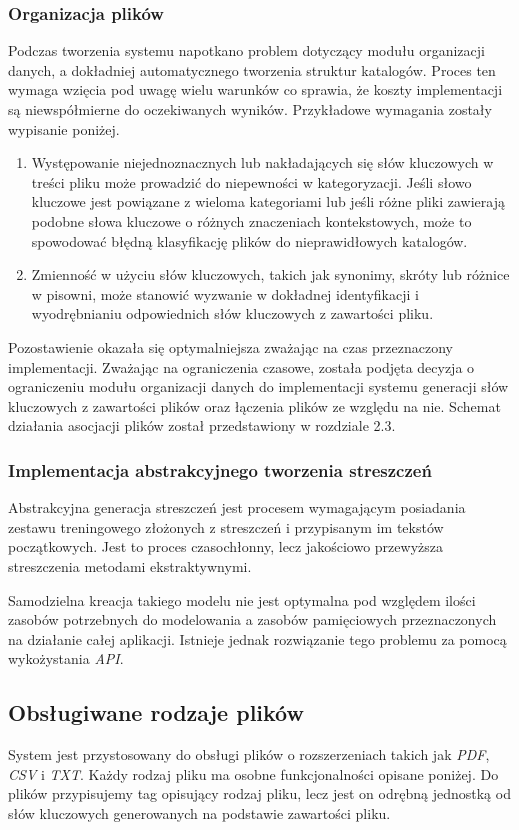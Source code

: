 \documentclass[12pt,a4paper,twoside]{article}
\begin{document}
\subsubsection*{Organizacja plików}
Podczas tworzenia systemu napotkano problem dotyczący modułu organizacji danych, a dokładniej automatycznego tworzenia struktur katalogów. Proces ten wymaga wzięcia pod uwagę wielu warunków co sprawia, że koszty implementacji są niewspółmierne do oczekiwanych wyników. Przykładowe wymagania zostały wypisanie poniżej.
\begin{enumerate}
	\item Występowanie niejednoznacznych lub nakładających się słów kluczowych w treści pliku może prowadzić do niepewności w kategoryzacji. Jeśli słowo kluczowe jest powiązane z wieloma kategoriami lub jeśli różne pliki zawierają podobne słowa kluczowe o różnych znaczeniach kontekstowych, może to spowodować błędną klasyfikację plików do nieprawidłowych katalogów.
	\item Zmienność w użyciu słów kluczowych, takich jak synonimy, skróty lub różnice w pisowni, może stanowić wyzwanie w dokładnej identyfikacji i wyodrębnianiu odpowiednich słów kluczowych z zawartości pliku. 
\end{enumerate}
Pozostawienie okazała się optymalniejsza zważając na czas przeznaczony implementacji.
Zważając na ograniczenia czasowe, została podjęta decyzja o ograniczeniu modułu organizacji danych do implementacji systemu generacji słów kluczowych z zawartości plików oraz łączenia plików ze względu na nie. Schemat działania asocjacji plików został przedstawiony w rozdziale 2.3.
\subsubsection*{Implementacja abstrakcyjnego tworzenia streszczeń}
Abstrakcyjna generacja streszczeń jest procesem wymagającym posiadania zestawu treningowego złożonych z streszczeń i przypisanym im tekstów początkowych. Jest to proces czasochłonny, lecz jakościowo przewyższa streszczenia metodami ekstraktywnymi. \par
Samodzielna kreacja takiego modelu nie jest optymalna pod względem ilości zasobów potrzebnych do modelowania a zasobów pamięciowych przeznaczonych na działanie całej aplikacji. Istnieje jednak rozwiązanie tego problemu za pomocą wykożystania \textit{API}. 
\subsection{Obsługiwane rodzaje plików}
System jest przystosowany do obsługi plików o rozszerzeniach takich jak \textit{PDF}, \textit{CSV} i \textit{TXT}. Każdy rodzaj pliku ma osobne funkcjonalności opisane poniżej. Do plików przypisujemy tag opisujący rodzaj pliku, lecz jest on odrębną jednostką od słów kluczowych generowanych na podstawie zawartości pliku.
\end{document}
